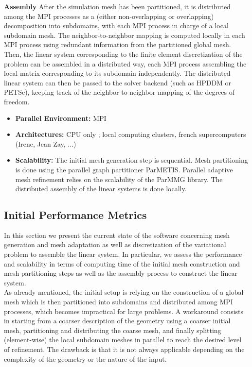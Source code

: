 \textbf{Assembly} After the simulation mesh has been partitioned, it is distributed among the MPI processes as a (either non-overlapping or overlapping) decomposition into subdomains, with each MPI process in charge of a local subdomain mesh. The neighbor-to-neighbor mapping is computed locally in each MPI process using redundant information from the partitioned global mesh. Then, the linear system corresponding to the finite element discretization of the problem can be assembled in a distributed way, each MPI process assembling the local matrix corresponding to its subdomain independently. The distributed linear system can then be passed to the solver backend (such as HPDDM or PETSc), keeping track of the neighbor-to-neighbor mapping of the degrees of freedom.

\begin{itemize}
    \item \textbf{Parallel Environment:} MPI

    \item \textbf{Architectures:} CPU only ; local computing clusters, french supercomputers (Irene, Jean Zay, ...)
 
    \item \textbf{Scalability:} The initial mesh generation step is sequential. Mesh partitioning is done using the parallel graph partitioner ParMETIS. Parallel adaptive mesh refinement relies on the scalability of the ParMMG library. The distributed assembly of the linear systems is done locally.
\end{itemize}

\subsection{Initial Performance Metrics}
\label{sec:WP1:Freefem++:metrics}

In this section we present the current state of the software concerning mesh generation and mesh adaptation as well as discretization of the variational problem to assemble the linear system. In particular, we assess the performance and scalability in terms of computing time of the initial mesh construction and mesh partitioning steps as well as the assembly process to construct the linear system.\\

As already mentioned, the initial setup is relying on the construction of a global mesh which is then partitioned into subdomains and distributed among MPI processes, which becomes impractical for large problems. A workaround consists in starting from a coarser description of the geometry using a coarser initial mesh, partitioning and distributing the coarse mesh, and ﬁnally splitting (element-wise) the local subdomain meshes in parallel to reach the desired level of reﬁnement. The drawback is that it is not always applicable depending on the complexity of the geometry or the nature of the input.\\

